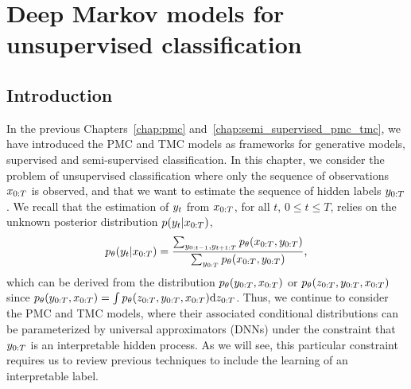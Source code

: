\chapter{Deep Markov models for unsupervised classification}

\label{chap:unsp_pmc_tmc}

\localtableofcontents
\pagebreak

\section{Introduction}



In the previous Chapters~\ref{chap:pmc}
and~\ref{chap:semi_supervised_pmc_tmc}, 
we have introduced the PMC and TMC models as frameworks for generative models,
supervised and semi-supervised classification.
In this chapter, we consider the problem of unsupervised classification
where only the sequence of observations $x_{0:T}$ is observed,
and that we want to estimate the sequence of hidden labels $y_{0:T}$.
We recall that the estimation of $y_t$ from $x_{0:T}$, for all $t$, $0\leq t \leq T$, relies 
on the  unknown posterior distribution $p(y_t|x_{0:T})$,
\begin{equation*}
  p_{\theta}(y_t|x_{0:T})=
  \frac{\sum_{y_{0:t-1},y_{t+1:T}} p_{\theta}(x_{0:T}, y_{0:T}) } 
  {\sum_{y_{0:T}} p_{\theta}(x_{0:T}, y_{0:T})} \text{,}
\end{equation*} 
which can be derived from the distribution $p_{\theta}(y_{0:T},x_{0:T})$
or $p_{\theta}(z_{0:T},y_{0:T},x_{0:T})$ since 
$p_{\theta}(y_{0:T},x_{0:T})=\int p_{\theta}(z_{0:T},y_{0:T},x_{0:T}) 
\mathrm{d}z_{0:T}$.
Thus, we continue to consider the PMC and TMC models, where their 
associated conditional distributions can be parameterized by 
universal approximators (DNNs) under the constraint
that $y_{0:T}$ is an interpretable hidden process. 
As we will see, this particular constraint requires us to review previous
techniques to include the learning of an interpretable label.


